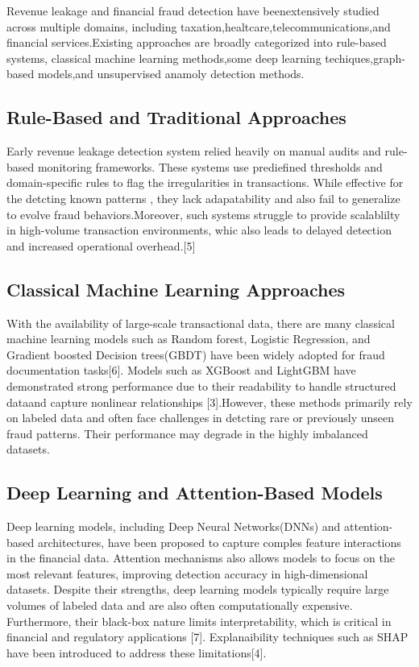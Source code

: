 \documentclass[conference]{IEEEtran}
\begin{document}
Revenue leakage and financial fraud detection have beenextensively studied across multiple domains, including taxation,healtcare,telecommunications,and financial services.Existing approaches are broadly categorized into rule-based systems, classical machine learning methods,some deep learning techiques,graph-based models,and unsupervised anamoly detection methods.      


\subsection{Rule-Based and Traditional Approaches}
Early revenue leakage detection system relied heavily on manual audits and rule-based monitoring frameworks. These systems use prediefined thresholds and domain-specific rules to flag the irregularities in transactions. While effective for the detcting known patterns , they lack adapatability and also fail to generalize to evolve fraud behaviors.Moreover, such systems struggle to provide scalablilty in high-volume transaction environments, whic also leads to delayed detection and increased operational overhead.[5]


\subsection{Classical Machine Learning Approaches}

With the availability of large-scale transactional data, there are many classical machine learning models such as Random forest, Logistic Regression, and Gradient boosted Decision trees(GBDT) have been widely adopted for fraud documentation tasks[6]. Models such as XGBoost and LightGBM have demonstrated strong performance due to their readability to handle structured dataand capture nonlinear relationships [3].However, these methods primarily rely on labeled data and often face challenges in detcting rare or previously unseen fraud patterns. Their performance may degrade in the highly imbalanced datasets.


\subsection{Deep Learning and Attention-Based Models}
Deep learning models, including Deep Neural Networks(DNNs) and attention-based architectures, have been proposed to capture comples feature interactions in the financial data. Attention mechanisms also allows models to focus on the most relevant features, improving detection accuracy in high-dimensional datasets. Despite their strengths, deep learning models typically require large volumes of labeled data and are also often computationally expensive. Furthermore, their black-box nature limits interpretability, which is critical in financial and regulatory applications [7]. Explanaibility techniques such as SHAP have been introduced to address these limitations[4].
\end{document}
